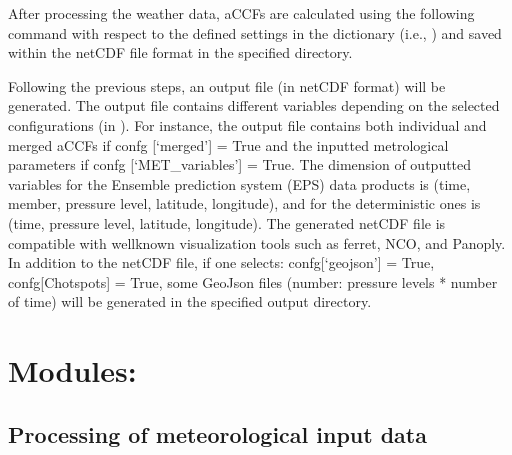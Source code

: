 \documentclass[a4paper,11pt,english]{sphinxmanual}
\begin{document}
\begin{sphinxVerbatim}[commandchars=\\\{\}]
    
\end{sphinxVerbatim}

\sphinxAtStartPar
After processing the weather data, aCCFs are calculated using the following command with respect to the defined settings in the dictionary (i.e., ) and saved within the netCDF file format in the specified directory.

\begin{sphinxVerbatim}[commandchars=\\\{\}]
\end{sphinxVerbatim}

\sphinxAtStartPar
Following the previous steps, an output file (in netCDF format) will be generated. The output file contains different variables depending on the selected configurations (in ).
For instance, the output file contains both individual and merged aCCFs  if confg {[}‘merged’{]} = True and the inputted metrological parameters if confg {[}‘MET\_variables’{]} = True. The dimension of outputted variables for the Ensemble prediction system (EPS) data products is (time, member, pressure level, latitude, longitude), and for the deterministic ones is (time, pressure level, latitude, longitude).
The generated netCDF file is compatible with well\sphinxhyphen{}known visualization tools such as ferret, NCO, and Panoply.
In addition to the netCDF file, if one selects: confg{[}‘geojson’{]} = True, confg{[}Chotspots{]} = True, some GeoJson files (number: pressure levels * number of time) will be generated in the specified output directory.


\chapter{Modules:}
\label{\detokenize{index:modules}}
\sphinxstepscope


\section{Processing of meteorological input data}
\label{\detokenize{modules:module-climaccf.extract_data}}\label{\detokenize{modules:processing-of-meteorological-input-data}}\label{\detokenize{modules::doc}}
\end{document}
